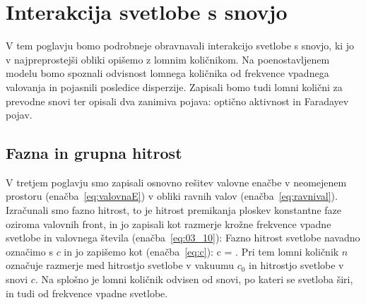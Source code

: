
\chapter{Interakcija svetlobe s snovjo}
V tem poglavju bomo podrobneje obravnavali interakcijo svetlobe s snovjo, ki jo 
v najpreprostejši obliki opišemo z lomnim količnikom. Na poenostavljenem modelu
bomo spoznali odvisnost lomnega količnika od frekvence vpadnega valovanja in pojasnili
posledice disperzije. Zapisali bomo tudi lomni količni za prevodne snovi ter
opisali dva zanimiva pojava: optično aktivnost in Faradayev pojav.

\section{Fazna in grupna hitrost}
V tretjem poglavju smo zapisali osnovno rešitev valovne enačbe
v neomejenem prostoru (enačba~\ref{eq:valovnaE}) v obliki ravnih valov 
(enačba~\ref{eq:ravnival}). Izračunali smo fazno hitrost,
to je hitrost premikanja ploskev konstantne faze oziroma valovnih front, in
jo zapisali kot razmerje krožne frekvence vpadne svetlobe 
in valovnega števila (enačba~\ref{eq:03_10}):
Fazno hitrost svetlobe navadno označimo s $c$ in jo zapišemo kot (enačba~\ref{eq:c}):
\beq
c = .
\label{eq:09_01}
\eeq
Pri tem lomni količnik $n$ označuje razmerje med hitrostjo svetlobe v 
vakuumu $c_0$ in hitrostjo svetlobe v snovi $c$. Na splošno je lomni količnik odvisen 
od snovi, po kateri se svetloba širi, in tudi od frekvence vpadne svetlobe.

